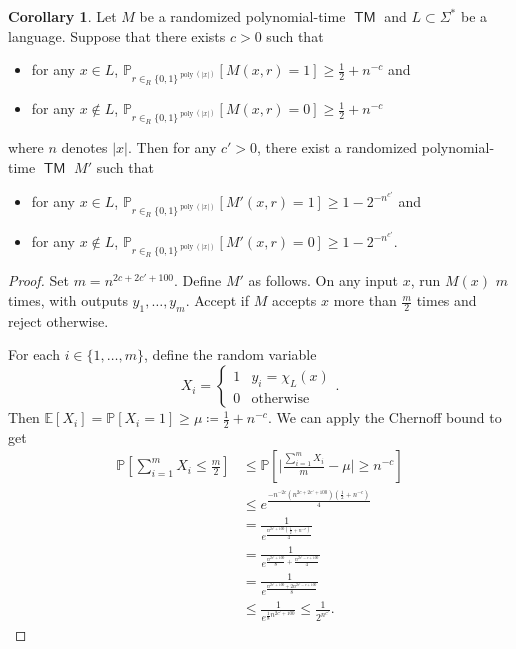 \documentclass[10pt,letterpaper,cm]{nupset}
\theoremstyle{definition}
\theoremstyle{theorem}
\newtheorem{corollary}[definition]{Corollary}
\theoremstyle{remark}
\newcommand{\1}{\mathbf{1}}
\newcommand{\0}{\vec 0}
\DeclareMathOperator{\TM}{\mathsf{TM}}
\DeclareMathOperator{\poly}{poly}
\begin{document}
\begin{corollary}
Let $M$ be a randomized polynomial-time $\TM$ and $L\subset \Sigma^{\ast}$ be a language. Suppose that there exists $c>0$ such that
\begin{itemize}
\item for any $x\in L$, $\mathbb{P}_{r\in_R \{0,1\}^{\poly(\lvert{x}\rvert)}}[M(x,r)=1] \geq \frac{1}{2} +n^{-c}$ and
\item for any $x\notin L$, $\mathbb{P}_{r\in_R \{0,1\}^{\poly(\lvert{x}\rvert)}}[M(x,r)=0] \geq \frac{1}{2} + n^{-c}$
\end{itemize} where $n$ denotes $|x|$.
Then for any $c' >0$, there exist a randomized polynomial-time $\TM$ $M'$ such that 
\begin{itemize}
\item for any $x\in L$, $\mathbb{P}_{r\in_R \{0,1\}^{\poly(\lvert{x}\rvert)}}[M'(x,r)=1] \geq 1 - 2^{{-}n^{c'}}$ and
\item for any $x\notin L$, $\mathbb{P}_{r\in_R \{0,1\}^{\poly(\lvert{x}\rvert)}}[M'(x,r)=0] \geq 1 - 2^{{-}n^{c'}}$.
\end{itemize}
\end{corollary}
\begin{proof}
Set $m = n^{2c + 2c' + 100}$. Define $M'$ as follows. On any input $x$, run $M(x)$ $m$ times, with outputs $y_1, \ldots, y_m$. Accept if $M$ accepts $x$ more than $\frac{m}{2}$ times and reject otherwise.

\medskip

  For each $i\in \{1, \ldots, m\}$, define the random variable $$ X_i = \begin{cases} 1 & y_i = \chi_L(x) \\ 0 & \text{otherwise} \end{cases} .$$ Then $\mathbb{E}[X_i] = \mathbb{P}[X_i=1] \geq \mu\coloneqq \frac{1}{2} + n^{{-}c}$. We can apply the Chernoff bound to get   
\begin{align*}
 \mathbb{P}\left[\sum_{i=1}^m X_i \leq \frac{m}{2}\right] & \leq \mathbb{P}\left[ \lvert{\frac{\sum_{i=1}^m X_i}{m} -\mu}\rvert \geq n^{-c}\right] 
\\ & \leq
 e^{ \frac{ {-}n^{{-}2c}(n^{2c + 2c' + 100})(\frac{1}{2}+ n^{-c})}{4}
 }
 \\ & = \frac{1}{e^{\frac{ n^{2c' +100}(\frac{1}{2} + n^{{-}c} )                 }{  4   }}  }
 \\ & = \frac{1}{e^{ \frac{n^{2c' +100}}{8} +\frac{n^{2c' -c+100}}{4}          }}
 \\ & =  \frac{1}{e^{ \frac{n^{2c' +100} + 2 n^{2c' -c+100}}{8}       }}
 \\ &
 \leq \frac{1}{e^{\frac{1}{8}n^{2c' +100}}   }\leq \frac{1}{2^{n^{c'}}} . 
\end{align*} 
\end{proof}
\end{document}
